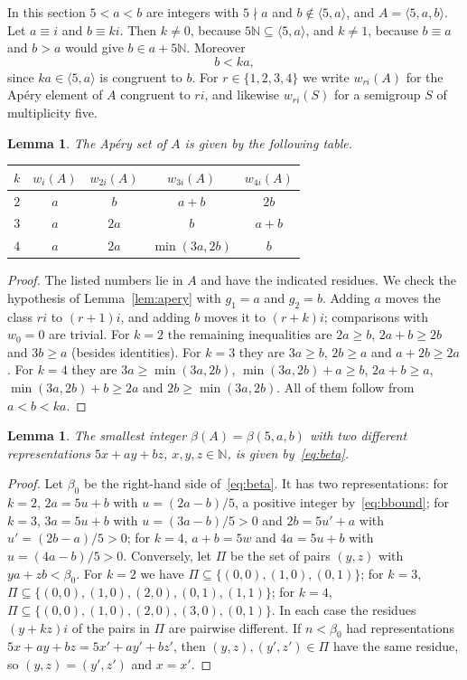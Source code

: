 \documentclass{amsart}
\newtheorem{lemma}[theorem]{Lemma}
\theoremstyle{definition}
\theoremstyle{remark}
\numberwithin{equation}{section}
\newcommand{\N}{\mathbb{N}}
\newcommand{\gen}[1]{\langle #1\rangle}
\begin{document}
In this section $5<a<b$ are integers with $5\nmid a$ and $b\notin\gen{5,a}$, and $A=\gen{5,a,b}$. Let $a\equiv i$ and $b\equiv ki$. Then $k\ne0$, because $5\N\subseteq\gen{5,a}$, and $k\ne1$, because $b\equiv a$ and $b>a$ would give $b\in a+5\N$. Moreover
\begin{equation}\label{eq:bbound}
b<ka,
\end{equation}
since $ka\in\gen{5,a}$ is congruent to $b$. For $r\in\{1,2,3,4\}$ we write $w_{ri}(A)$ for the Ap\'ery element of $A$ congruent to $ri$, and likewise $w_{ri}(S)$ for a semigroup $S$ of multiplicity five.

\begin{lemma}\label{lem:aperyA}
The Ap\'ery set of $A$ is given by the following table.
\begin{center}
\begin{tabular}{ccccc}
\toprule
$k$ & $w_i(A)$ & $w_{2i}(A)$ & $w_{3i}(A)$ & $w_{4i}(A)$\\
\midrule
$2$ & $a$ & $b$ & $a+b$ & $2b$\\
$3$ & $a$ & $2a$ & $b$ & $a+b$\\
$4$ & $a$ & $2a$ & $\min(3a,2b)$ & $b$\\
\bottomrule
\end{tabular}
\end{center}
\end{lemma}

\begin{proof}
The listed numbers lie in $A$ and have the indicated residues. We check the hypothesis of Lemma~\ref{lem:apery} with $g_1=a$ and $g_2=b$. Adding $a$ moves the class $ri$ to $(r+1)i$, and adding $b$ moves it to $(r+k)i$; comparisons with $w_0=0$ are trivial. For $k=2$ the remaining inequalities are $2a\ge b$, $2a+b\ge2b$ and $3b\ge a$ (besides identities). For $k=3$ they are $3a\ge b$, $2b\ge a$ and $a+2b\ge2a$. For $k=4$ they are $3a\ge\min(3a,2b)$, $\min(3a,2b)+a\ge b$, $2a+b\ge a$, $\min(3a,2b)+b\ge2a$ and $2b\ge\min(3a,2b)$. All of them follow from $a<b<ka$.
\end{proof}

\begin{lemma}\label{lem:beta}
The smallest integer $\beta(A)=\beta(5,a,b)$ with two different representations $5x+ay+bz$, $x,y,z\in\N$, is given by~\eqref{eq:beta}.
\end{lemma}

\begin{proof}
Let $\beta_0$ be the right-hand side of~\eqref{eq:beta}. It has two representations: for $k=2$, $2a=5u+b$ with $u=(2a-b)/5$, a positive integer by~\eqref{eq:bbound}; for $k=3$, $3a=5u+b$ with $u=(3a-b)/5>0$ and $2b=5u'+a$ with $u'=(2b-a)/5>0$; for $k=4$, $a+b=5w$ and $4a=5u+b$ with $u=(4a-b)/5>0$. Conversely, let $\Pi$ be the set of pairs $(y,z)$ with $ya+zb<\beta_0$. For $k=2$ we have $\Pi\subseteq\{(0,0),(1,0),(0,1)\}$; for $k=3$, $\Pi\subseteq\{(0,0),(1,0),(2,0),(0,1),(1,1)\}$; for $k=4$, $\Pi\subseteq\{(0,0),(1,0),(2,0),(3,0),(0,1)\}$. In each case the residues $(y+kz)i$ of the pairs in $\Pi$ are pairwise different. If $n<\beta_0$ had representations $5x+ay+bz=5x'+ay'+bz'$, then $(y,z),(y',z')\in\Pi$ have the same residue, so $(y,z)=(y',z')$ and $x=x'$.
\end{proof}
\end{document}

